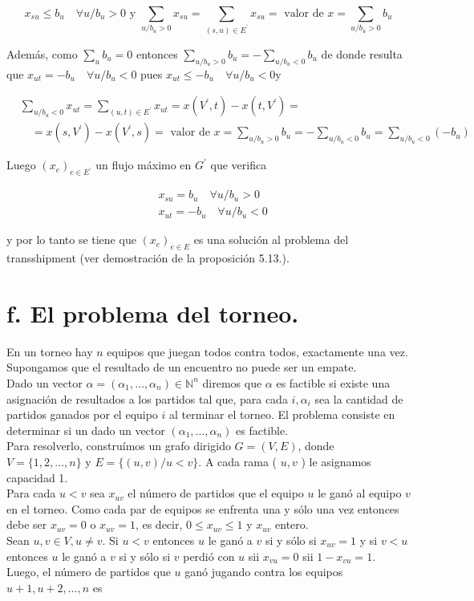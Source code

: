 \documentclass[10pt]{article}
\begin{document}
$$
x_{s u} \leq b_{u} \quad \forall u / b_{u}>0 \text { y } \sum_{u / b_{u}>0} x_{s u}=\sum_{(s, u) \in E^{\prime}} x_{s u}=\text { valor de } x=\sum_{u / b_{u}>0} b_{u}
$$

Además, como $\sum_{u} b_{u}=0$ entonces $\sum_{u / b_{u}>0} b_{u}=-\sum_{u / b_{u}<0} b_{u}$ de donde resulta que $x_{u t}=-b_{u} \quad \forall u / b_{u}<0$ pues $x_{u t} \leq-b_{u} \quad \forall u / b_{u}<0 \mathrm{y}$

$$
\begin{aligned}
& \sum_{u / b_{u}<0} x_{u t}=\sum_{(u, t) \in E^{\prime}} x_{u t}=x\left(V^{\prime}, t\right)-x\left(t, V^{\prime}\right)= \\
& \quad=x\left(s, V^{\prime}\right)-x\left(V^{\prime}, s\right)=\text { valor de } x=\sum_{u / b_{u}>0} b_{u}=-\sum_{u / b_{u}<0} b_{u}=\sum_{u / b_{u}<0}\left(-b_{u}\right)
\end{aligned}
$$

Luego $\left(x_{e}\right)_{e \in E^{\prime}}$ un flujo máximo en $G^{\prime}$ que verifica

$$
\begin{aligned}
& x_{s u}=b_{u} \quad \forall u / b_{u}>0 \\
& x_{u t}=-b_{u} \quad \forall u / b_{u}<0
\end{aligned}
$$

y por lo tanto se tiene que $\left(x_{e}\right)_{e \in E}$ es una solución al problema del transshipment (ver demostración de la proposición 5.13.).

\section*{f. El problema del torneo.}
En un torneo hay $n$ equipos que juegan todos contra todos, exactamente una vez. Supongamos que el resultado de un encuentro no puede ser un empate.\\
Dado un vector $\alpha=\left(\alpha_{1}, \ldots, \alpha_{n}\right) \in \mathbb{N}^{n}$ diremos que $\alpha$ es factible si existe una asignación de resultados a los partidos tal que, para cada $i, \alpha_{i}$ sea la cantidad de partidos ganados por el equipo $i$ al terminar el torneo. El problema consiste en determinar si un dado un vector $\left(\alpha_{1}, \ldots, \alpha_{n}\right)$ es factible.\\
Para resolverlo, construímos un grafo dirigido $G=(V, E)$, donde $V=\{1,2, \ldots, n\}$ y $E=\{(u, v) / u<v\}$. A cada rama ( $u, v$ ) le asignamos capacidad 1.\\
Para cada $u<v$ sea $x_{u v}$ el número de partidos que el equipo $u$ le ganó al equipo $v$ en el torneo. Como cada par de equipos se enfrenta una y sólo una vez entonces debe ser $x_{u v}=0$ o $x_{u v}=1$, es decir, $0 \leq x_{u v} \leq 1$ y $x_{u v}$ entero.\\
Sean $u, v \in V, u \neq v$. Si $u<v$ entonces $u$ le ganó a $v$ si y sólo si $x_{u v}=1$ y si $v<u$ entonces $u$ le ganó a $v$ si y sólo si $v$ perdió con $u$ sii $x_{v u}=0$ sii $1-x_{v u}=1$. Luego, el número de partidos que $u$ ganó jugando contra los equipos $u+1, u+2, \ldots, n$ es
\end{document}
